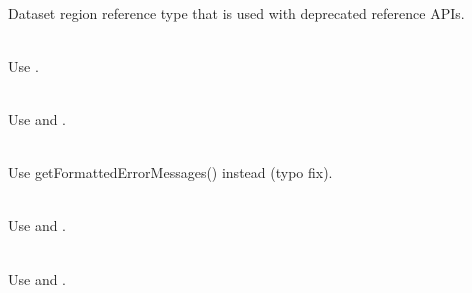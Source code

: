 \begin{DoxyRefList}
\item[{\parbox[t]{\linewidth}{Struct \doxylink{structhdset__reg__ref__t}{hdset\+\_\+reg\+\_\+ref\+\_\+t} }}]\hfill \\
\label{deprecated__deprecated000115}%
%
Dataset region reference type that is used with deprecated reference APIs. 
\item[{\parbox[t]{\linewidth}{Class \doxylink{class_json_1_1_fast_writer}{Json::\+Fast\+Writer} }}]\hfill \\
\label{deprecated__deprecated000130}%
%
Use .  
\item[{\parbox[t]{\linewidth}{Class \doxylink{class_json_1_1_reader}{Json::\+Reader} }}]\hfill \\
\label{deprecated__deprecated000125}%
%
Use  and .  
\item[{\parbox[t]{\linewidth}{Member \doxylink{class_json_1_1_reader_aefbd729b536bcffe2c8051ddcb5ea0bc}{Json::\+Reader::\+get\+Formated\+Error\+Messages} () const}}]\hfill \\
\label{deprecated__deprecated000128}%
%
Use get\+Formatted\+Error\+Messages() instead (typo fix).  
\item[{\parbox[t]{\linewidth}{Member \doxylink{class_json_1_1_reader_a0b3c4e24c8393354bab57a6ba3ffc27f}{Json::\+Reader::\+Reader} ()}}]\hfill \\
\label{deprecated__deprecated000126}%
%
Use  and .  
\item[{\parbox[t]{\linewidth}{Member \doxylink{class_json_1_1_reader_a45f17831118337309180313e93ac33f8}{Json::\+Reader::\+Reader} (const \doxylink{class_json_1_1_features}{Features} \&features)}}]\hfill \\
\label{deprecated__deprecated000127}%
%
Use  and .  
\item[{\parbox[t]{\linewidth}{Class \doxylink{class_json_1_1_styled_stream_writer}{Json::\+Styled\+Stream\+Writer} }}]\hfill \\

\end{DoxyRefList}
